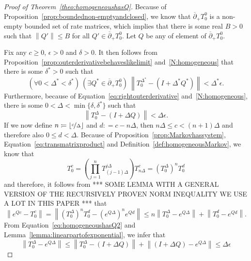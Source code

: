 \documentclass[10pt]{paper}
\theoremstyle{definition}
\newcommand{\norm}[1]{\left\lVert #1 \right\rVert}
\newcommand{\coloneqq}{:\!=}
\begin{document}
\begin{proof}[Proof of Theorem~\ref{theo:homogeneoushasQ}]
Because of Proposition~\ref{prop:boundednon-emptyandclosed}, we know that $\overline{\partial}_{+}
{T^0_{0}}$ is a non-empty bounded set of rate matrices, which implies that there is some real $B>0$ such that $\norm{Q'}\leq B$ for all $Q'\in\overline{\partial}_{+}
{T^0_{0}}$. Let $Q$ be any of element of $\overline{\partial}_{+}
{T^0_{0}}$.


Fix any $c\geq0$, $\epsilon>0$ and $\delta>0$. 
It then follows from Proposition~\ref{prop:outerderivativebehaveslikelimit} and~\ref{N:homogeneous} that there is some $\delta^*>0$ such that
\begin{equation}
\label{eq:homogeneoushasQ1}
(\forall 0<\Delta^*<\delta^*)
~
(\exists Q^*\in\overline{\partial}_{+}
{T^0_{0}})
~
\norm{T_0^{\Delta^*}-(I+\Delta^*Q^*)}<\Delta^*\epsilon.
\end{equation}
Furthermore, because of Equation~\eqref{eq:rightouterderivative} and~\ref{N:homogeneous}, there is some $0<\Delta<\min\{\delta,\delta^*\}$ such that
\begin{equation}
\label{eq:homogeneoushasQ2}
\norm{T^{\Delta}_{0}-(I+\Delta Q)}<\Delta\epsilon.
\end{equation}
If we now define $n\coloneqq\lfloor\nicefrac{c}{\Delta}\rfloor$ and $d\coloneqq c-n\Delta$, then $n\Delta\leq c<(n+1)\Delta$ and therefore also $0\leq d<\Delta$. Because of Proposition~\ref{prop:Markovhassystem}, Equation~\eqref{eq:transmatrixproduct} and Definition~\ref{def:homogeneousMarkov}, we know that
\begin{equation*}
T_0^c=\left(
\prod_{j=1}^{n}
T_{(j-1)\Delta}^{j\Delta}
\right)
T_{n\Delta}^c
=\left(T_0^{\Delta}\right)^{n}
T_0^{d}
\end{equation*}
and therefore, it follows from *** SOME LEMMA WITH A GENERAL VERSION OF THE RECURSIVELY PROVEN NORM INEQUALITY WE USE A LOT IN THIS PAPER *** that
\begin{equation}
\label{eq:homogeneoushasQ3}
\norm{
	e^{Qc}-T_0^c
}
=
\norm{
\left(T_0^{\Delta}\right)^{n}
T_0^{d}
-
\left(
e^{Q\Delta}
\right)^{n}
e^{Qd}
}
\leq
n\norm{T_0^{\Delta}-e^{Q\Delta}}
+\norm{T_0^{d}-e^{Qd}}.
\end{equation}
From Equation~\eqref{eq:homogeneoushasQ2} and Lemma~\ref{lemma:linearpartofexponential}, we infer that
\begin{equation}
\label{eq:homogeneoushasQ4}
\norm{T_0^{\Delta}-e^{Q\Delta}}
\leq
\norm{T_0^{\Delta}-(I+\Delta Q)}
+
\norm{(I+\Delta Q)-e^{Q\Delta}}
\leq
\Delta\epsilon

\end{equation}
\end{proof}
\end{document}

